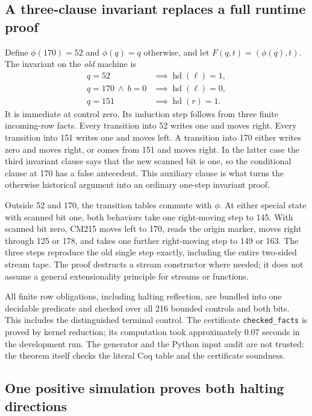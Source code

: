 \subsection{A three-clause invariant replaces a full runtime proof}

Define $\phi(170)=52$ and $\phi(q)=q$ otherwise, and let
$F(q,t)=(\phi(q),t)$. The invariant on the \emph{old} machine is
\begin{align*}
 q=52  &\implies \operatorname{hd}(\ell)=1,\\
 q=170\ \wedge\ b=0 &\implies \operatorname{hd}(\ell)=0,\\
 q=151 &\implies \operatorname{hd}(r)=1.
\end{align*}
It is immediate at control zero. Its induction step follows from three finite
incoming-row facts. Every transition into 52 writes one and moves right.
Every transition into 151 writes one and moves left. A transition into 170
either writes zero and moves right, or comes from 151 and moves right. In the
latter case the third invariant clause says that the new scanned bit is one,
so the conditional clause at 170 has a false antecedent. This auxiliary
clause is what turns the otherwise historical argument into an ordinary
one-step invariant proof.

Outside 52 and 170, the transition tables commute with $\phi$. At either
special state with scanned bit one, both behaviors take one right-moving
step to 145. With scanned bit zero, CM215 moves left to 170, reads the origin
marker, moves right through 125 or 178, and takes one further right-moving
step to 149 or 163. The three steps reproduce the old single step exactly,
including the entire two-sided stream tape. The proof destructs a stream
constructor where needed; it does not assume a general extensionality
principle for streams or functions.

All finite row obligations, including halting reflection, are bundled into
one decidable predicate and checked over all 216 bounded controls and both
bits. This includes the distinguished terminal control. The certificate
\texttt{checked\_facts} is proved by kernel reduction; its computation took
approximately $0.07$ seconds in the development run. The generator and the
Python input audit are not trusted: the theorem itself checks the literal
Coq table and the certificate soundness.

\subsection{One positive simulation proves both halting directions}

